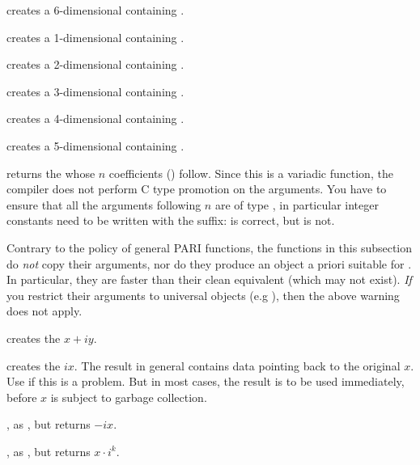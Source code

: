  creates a 6-dimensional
 containing .

 creates a 1-dimensional 
containing .

 creates a 2-dimensional 
containing \kbd{[x, y]}.

 creates a 3-dimensional
 containing \kbd{[x, y, z]}.

 creates a 4-dimensional
 containing \kbd{[x, y, z, t]}.

 creates a
5-dimensional  containing \kbd{[x, y, z, t, u]}.

 returns the  whose $n$
coefficients () follow.
 Since this is a variadic function, the compiler does
not perform C type promotion on the arguments. You have to ensure that all
the arguments following $n$ are of type , in particular integer
constants need to be written with the  suffix:
 is correct, but  is not.

\label{se:unclean}

Contrary to the policy of general PARI functions, the functions in this
subsection do \emph{not} copy their arguments, nor do they produce an object
a priori suitable for . In particular, they are
faster than their clean equivalent (which may not exist). \emph{If} you
restrict their arguments to universal objects (e.g ),
then the above warning does not apply.

 creates the  $x + iy$.

 creates the  $ix$. The result in
general contains data pointing back to the original $x$. Use  if
this is a problem. But in most cases, the result is to be used immediately,
before $x$ is subject to garbage collection.

, as , but returns $-ix$.

, as , but returns
$x \cdot i^k$.

